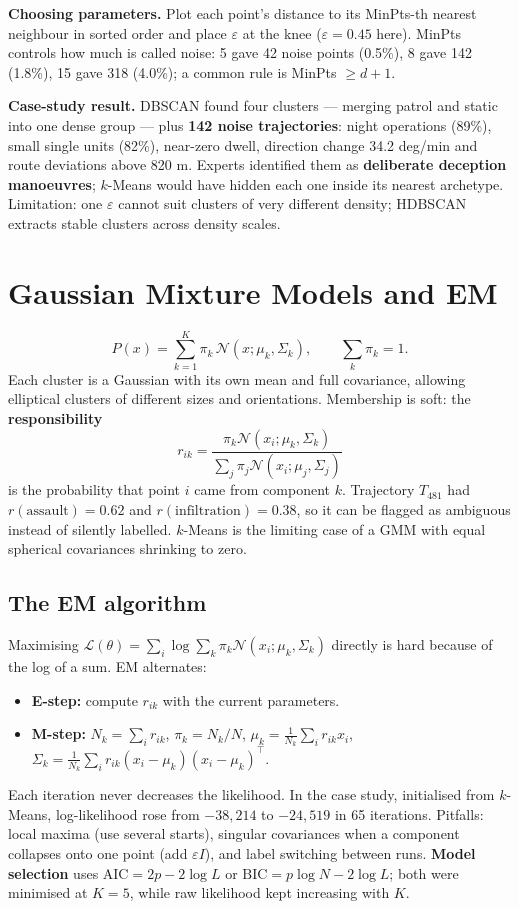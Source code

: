 \documentclass[11pt]{article}
\begin{document}
\textbf{Choosing parameters.} Plot each point's distance to its MinPts-th nearest neighbour in sorted order and place $\varepsilon$ at the knee ($\varepsilon=0.45$ here). MinPts controls how much is called noise: 5 gave 42 noise points (0.5\%), 8 gave 142 (1.8\%), 15 gave 318 (4.0\%); a common rule is MinPts $\ge d+1$.

\textbf{Case-study result.} DBSCAN found four clusters --- merging patrol and static into one dense group --- plus \textbf{142 noise trajectories}: night operations (89\%), small single units (82\%), near-zero dwell, direction change 34.2 deg/min and route deviations above 820 m. Experts identified them as \textbf{deliberate deception manoeuvres}; $k$-Means would have hidden each one inside its nearest archetype. Limitation: one $\varepsilon$ cannot suit clusters of very different density; HDBSCAN extracts stable clusters across density scales.

\section{Gaussian Mixture Models and EM}
\[P(x)=\sum_{k=1}^K\pi_k\,\mathcal N(x;\mu_k,\Sigma_k),\qquad\sum_k\pi_k=1.\]
Each cluster is a Gaussian with its own mean and full covariance, allowing elliptical clusters of different sizes and orientations. Membership is soft: the \textbf{responsibility}
\[r_{ik}=\frac{\pi_k\mathcal N(x_i;\mu_k,\Sigma_k)}{\sum_j\pi_j\mathcal N(x_i;\mu_j,\Sigma_j)}\]
is the probability that point $i$ came from component $k$. Trajectory $T_{481}$ had $r(\text{assault})=0.62$ and $r(\text{infiltration})=0.38$, so it can be flagged as ambiguous instead of silently labelled. $k$-Means is the limiting case of a GMM with equal spherical covariances shrinking to zero.

\subsection{The EM algorithm}
Maximising $\mathcal L(\theta)=\sum_i\log\sum_k\pi_k\mathcal N(x_i;\mu_k,\Sigma_k)$ directly is hard because of the log of a sum. EM alternates:
\begin{itemize}
\item \textbf{E-step:} compute $r_{ik}$ with the current parameters.
\item \textbf{M-step:} $N_k=\sum_ir_{ik}$, $\pi_k=N_k/N$, $\mu_k=\frac1{N_k}\sum_ir_{ik}x_i$, $\Sigma_k=\frac1{N_k}\sum_ir_{ik}(x_i-\mu_k)(x_i-\mu_k)^\top$.
\end{itemize}
Each iteration never decreases the likelihood. In the case study, initialised from $k$-Means, log-likelihood rose from $-38{,}214$ to $-24{,}519$ in 65 iterations. Pitfalls: local maxima (use several starts), singular covariances when a component collapses onto one point (add $\varepsilon I$), and label switching between runs. \textbf{Model selection} uses $\text{AIC}=2p-2\log L$ or $\text{BIC}=p\log N-2\log L$; both were minimised at $K=5$, while raw likelihood kept increasing with $K$.
\end{document}
